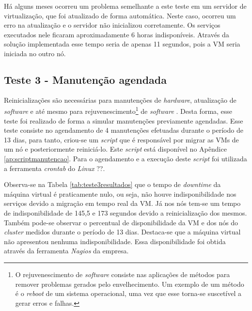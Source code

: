Há alguns meses ocorreu um problema semelhante a este teste em um servidor de virtualização, que foi atualizado de forma automática. Neste caso, 
ocorreu um erro na atualização e o servidor não inicializou corretamente. Os serviços executados nele ficaram aproximadamente 
6 horas indisponíveis. Através da solução implementada esse tempo seria de apenas 11 segundos, pois a \ac{VM} seria iniciada no outro nó. 

\subsection{Teste 3 - Manutenção agendada}


Reinicializações são necessárias para manutenções de \textit{hardware}, atualização de \textit{software} e até mesmo para 
rejuvenescimento\footnote{O rejuvenescimento de \textit{software} consiste nas aplicações de métodos para remover problemas gerados pelo 
envelhecimento. Um exemplo de um método é o \textit{reboot} de um sistema operacional, uma vez que esse torna-se suscetível a gerar erros e 
falhas.} de \textit{software} \cite{melo2014}. Desta forma, esse teste foi realizado de forma a simular manutenções previamente agendadas.
Esse teste consiste no agendamento de 4 manutenções efetuadas durante o período de 13 dias, para tanto, criou-se um \textit{script} que é 
responsável por migrar as \acp{VM} de um nó e posteriormente reiniciá-lo. Este \textit{script} está disponível no Apêndice 
\ref{ap:scriptmanutencao}. Para o agendamento e a execução deste \textit{script} foi utilizada a ferramenta \textit{crontab} do \textit{Linux}
\cite{neves2008} ??. 

Observa-se na Tabela \ref{tab:teste3resultados} que o tempo de \textit{downtime} da máquina virtual é praticamente nulo, ou seja, 
não houve indisponibilidade nos serviços devido a migração em tempo real da \ac{VM}. 
Já nos nós tem-se um tempo de indisponibilidade de 145,5 e 173 segundos devido a reinicialização dos mesmos.
Também pode-se observar o percentual de disponibilidade da \ac{VM} e dos nós do \textit{cluster} medidos durante o período de 13 dias.
Destaca-se que a máquina virtual não apresentou nenhuma indisponibilidade. Essa disponibilidade foi obtida através da ferramenta 
\textit{Nagios} \cite{nagios} da empresa.

